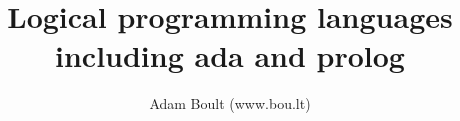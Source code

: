 \documentclass[oneside]{book}
\begin{document}
\author{Adam Boult (www.bou.lt)}
\title{Logical programming languages including ada and prolog}
\maketitle

\setcounter{tocdepth}{0}
\tableofcontents


\end{document}

